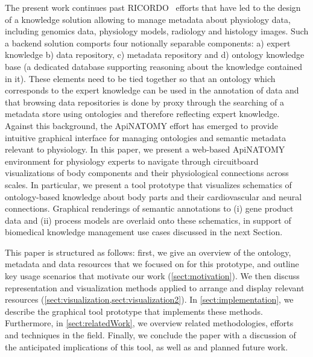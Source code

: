 The present work continues past RICORDO~\cite{BHW+11} efforts that have led to the design of a knowledge solution allowing to manage metadata about physiology data, including genomics data, physiology models, radiology and histology images. Such a backend solution comports four notionally separable components: a) expert knowledge b) data repository, c) metadata repository and d) ontology knowledge base (a dedicated database supporting reasoning about the knowledge contained in it). These elements need to be tied together so that an ontology which corresponds to the expert knowledge can be used in the annotation of data and that browsing data repositories is done by proxy through the searching of a metadata store using ontologies and therefore reflecting expert knowledge.
Against this background, the ApiNATOMY effort has emerged to provide intuitive graphical interface for managing ontologies and semantic metadata relevant to physiology. In this paper, we present a web-based ApiNATOMY environment for physiology experts to navigate through circuitboard visualizations of body components and their physiological connections across scales. In particular, we present a tool prototype that visualizes schematics of ontology-based knowledge about body parts and their cardiovascular and neural connections. Graphical renderings of semantic annotations to (i) gene product data and (ii) process models are overlaid onto these schematics, in support of biomedical knowledge management use cases discussed in the next Section.

This paper is structured as follows: first, we give an overview of the ontology, metadata and data resources that we focused on for this prototype, and outline key usage scenarios that motivate our work (\cref{sect:motivation}).  We then discuss representation and visualization methods applied to arrange and display relevant resources (\cref{sect:visualization,sect:visualization2}). In \cref{sect:implementation}, we describe the graphical tool prototype that implements these methods. Furthermore, in \cref{sect:relatedWork}, we overview related methodologies, efforts and techniques in the field. Finally, we conclude the paper with a discussion of the anticipated implications of this tool, as well as and planned future work.
